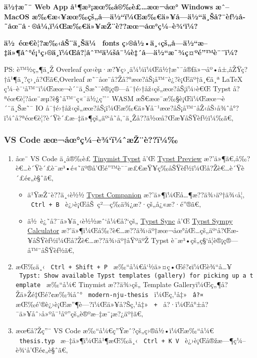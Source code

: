 \textbf{ä½†æ˜¯ Web App å¹¶æ²¡æœ‰å®‰è£\ldots æœ¬åœ° Windows æˆ-- MacOS
æ‰€æ‹¥æœ‰çš„å­---ä½``ï¼Œæ‰€ä»¥å­---ä½``ä¸Šå?¯èƒ½å­˜åœ¨å·®å¼‚ï¼Œæ‰€ä»¥æŽ¨è??æœ¬åœ°ç¼--è¾`ï¼?}

\textbf{ä½~éœ€è¦?æ‰‹åŠ¨ä¸Šä¼~ fonts
ç›®å½•ä¸‹çš„å­---ä½``æ--‡ä»¶åˆ°é¡¹ç›®ä¸­ï¼Œå?¦åˆ™ä¼šå¯¼è‡´å­---ä½``æ˜¾ç¤ºé''™è¯¯ï¼?}

PS: è™½ç„¶ä¸Ž Overleaf
çœ‹èµ·æ?¥ç›¸ä¼¼ï¼Œä½†æ˜¯å®ƒä»¬åº•å±‚åŽŸç?†å¹¶ä¸?ç›¸å?Œã€‚Overleaf
æ˜¯åœ¨å?Žå?°æœ?åŠ¡å™¨è¿?è¡Œäº†ä¸€ä¸ª LaTeX
ç¼--è¯`å™¨ï¼Œæœ¬è´¨ä¸Šæ˜¯è®¡ç®---å¯†é›†åž‹çš„æœ?åŠ¡ï¼›è€Œ Typst
å?ªéœ€è¦?åœ¨æµ?è§ˆå™¨ç«¯ä½¿ç''¨ WASM æŠ€æœ¯æ‰§è¡Œï¼Œæœ¬è´¨ä¸Šæ˜¯ IO
å¯†é›†åž‹çš„æœ?åŠ¡ï¼Œæ‰€ä»¥å¯¹æœ?åŠ¡å™¨åŽ‹åŠ›å¾ˆå°?ï¼ˆå?ªéœ€è¦?è´Ÿè´£æ--‡ä»¶çš„äº`å­˜å‚¨ä¸Žå??ä½œå?Œæ­¥åŠŸèƒ½ï¼‰ã€‚

\subsubsection{VS Code
æœ¬åœ°ç¼--è¾`ï¼ˆæŽ¨è??ï¼‰}\label{vs-code-uxe6ux153uxe5ux153uxe7uxbcuxe8uxbeuxefuxbcux2c6uxe6ux17euxe8uxefuxbc}

\begin{enumerate}
\tightlist
\item
  åœ¨ VS Code ä¸­å®‰è£
  \href{https://marketplace.visualstudio.com/items?itemName=myriad-dreamin.tinymist}{Tinymist
  Typst} å'Œ
  \href{https://marketplace.visualstudio.com/items?itemName=mgt19937.typst-preview}{Typst
  Preview}
  æ?'ä»¶ã€‚å‰?è€\ldots è´Ÿè´£è¯­æ³•é«˜äº®å'Œé''™è¯¯æ£€æŸ¥ç­‰åŠŸèƒ½ï¼Œå?Žè€\ldots è´Ÿè´£é¢„è§ˆã€‚

  \begin{itemize}
  \tightlist
  \item
    ä¹ŸæŽ¨è??ä¸‹è½½
    \href{https://marketplace.visualstudio.com/items?itemName=CalebFiggers.typst-companion}{Typst
    Companion} æ?'ä»¶ï¼Œå\ldots¶æ??ä¾›äº†ä¾‹å¦‚ \texttt{\ Ctrl\ +\ B\ }
    è¿›è¡ŒåŠ~ç²---ç­‰ä¾¿æ?·çš„å¿«æ?·é''®ã€‚
  \item
    ä½~è¿˜å?¯ä»¥ä¸‹è½½æˆ`å¼€å?{}`çš„
    \href{https://marketplace.visualstudio.com/items?itemName=OrangeX4.vscode-typst-sync}{Typst
    Sync} å'Œ
    \href{https://marketplace.visualstudio.com/items?itemName=OrangeX4.vscode-typst-sympy-calculator}{Typst
    Sympy Calculator}
    æ?'ä»¶ï¼Œå‰?è€\ldots æ??ä¾›äº†æœ¬åœ°åŒ\ldots çš„äº`å?Œæ­¥åŠŸèƒ½ï¼Œå?Žè€\ldots æ??ä¾›äº†åŸºäºŽ
    Typst è¯­æ³•çš„ç§`å­¦è®¡ç®---å™¨åŠŸèƒ½ã€‚
  \end{itemize}
\item
  æŒ‰ä¸‹ \texttt{\ Ctrl\ +\ Shift\ +\ P\ }
  æ‰``å¼€å`½ä»¤ç•Œé?¢ï¼Œè¾``å\ldots¥
  \texttt{\ Typst:\ Show\ available\ Typst\ templates\ (gallery)\ for\ picking\ up\ a\ template\ }
  æ‰``å¼€ Tinymist æ??ä¾›çš„ Template Galleryï¼Œç„¶å?Žä»Žé‡Œé?¢æ‰¾åˆ°
  \texttt{\ modern-nju-thesis\ } ï¼Œç‚¹å‡» \texttt{\ â?¤\ }
  æŒ‰é'®è¿›è¡Œæ''¶è---?ï¼Œä»¥å?Šç‚¹å‡» \texttt{\ +\ }
  å?·ï¼Œå°±å?¯ä»¥åˆ›å»ºå¯¹åº''çš„è®ºæ--‡æ¨¡æ?¿äº†ã€‚
\item
  æœ€å?Žç''¨ VS Code æ‰``å¼€ç''Ÿæˆ?çš„ç›®å½•ï¼Œæ‰``å¼€
  \texttt{\ thesis.typ\ } æ--‡ä»¶ï¼Œå¹¶æŒ‰ä¸‹ \texttt{\ Ctrl\ +\ K\ V\ }
  è¿›è¡Œå®žæ---¶ç¼--è¾`å'Œé¢„è§ˆã€‚
\end{enumerate}

